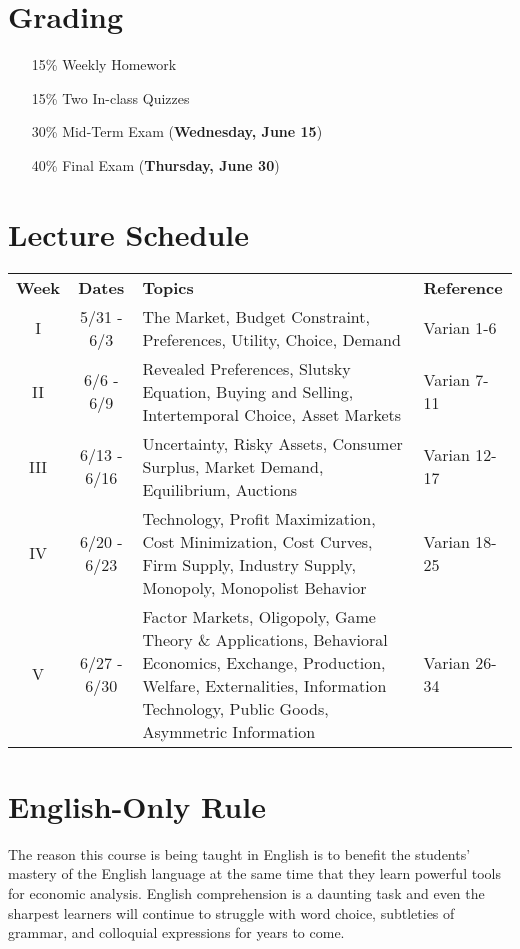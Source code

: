 \documentclass{article}
\begin{document}
\section*{Grading}

\begin{itemize}
\item [15\%] Weekly Homework
\item [15\%] Two In-class Quizzes
\item [30\%] Mid-Term Exam (\textbf{Wednesday, June 15})
\item [40\%] Final Exam (\textbf{Thursday, June 30})
\end{itemize}

\section*{Lecture Schedule}

\begin{table}[h]
\centering
\begin{tabular}{c c p{6cm} l}
\textbf{Week} & \textbf{Dates} & \textbf{Topics} & \textbf{Reference} \\
I & 5/31 - 6/3 & The Market, Budget Constraint, Preferences, Utility, Choice, Demand & Varian 1-6 \\
II & 6/6 - 6/9 & Revealed Preferences, Slutsky Equation, Buying and Selling, Intertemporal Choice, Asset Markets & Varian 7-11 \\
III & 6/13 - 6/16 & Uncertainty, Risky Assets, Consumer Surplus, Market Demand, Equilibrium, Auctions & Varian 12-17 \\
IV & 6/20 - 6/23 & Technology, Profit Maximization, Cost Minimization, Cost Curves, Firm Supply, Industry Supply, Monopoly, Monopolist Behavior & Varian 18-25 \\ 
V & 6/27 - 6/30 & Factor Markets, Oligopoly, Game Theory \& Applications, Behavioral Economics, Exchange, Production, Welfare, Externalities, Information Technology, Public Goods, Asymmetric Information & Varian 26-34 \\
\end{tabular}
\end{table}

\section*{English-Only Rule}

The reason this course is being taught in English is to benefit the students' mastery of the English language at the same time that they learn powerful tools for economic analysis. English comprehension is a daunting task and even the sharpest learners will continue to struggle with word choice, subtleties of grammar, and colloquial expressions for years to come.
\end{document}

